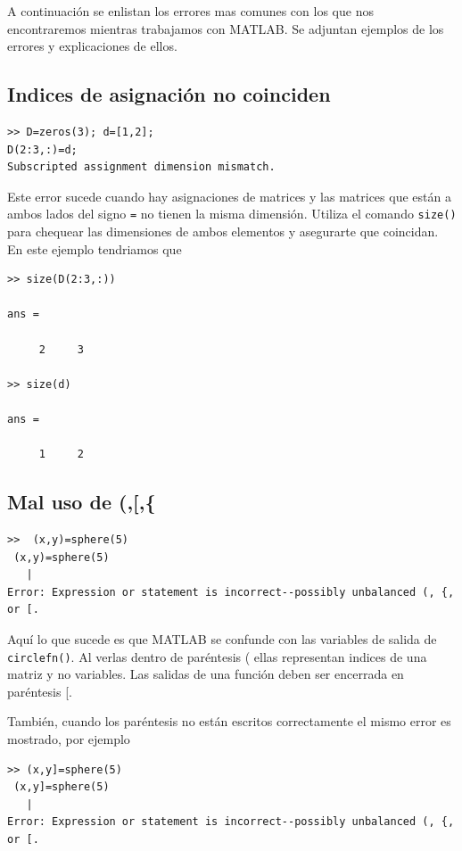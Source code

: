 \documentclass[11pt]{article}
\begin{document}
A continuaci\'on se enlistan los errores mas comunes con los que nos encontraremos mientras trabajamos con MATLAB. Se adjuntan ejemplos de los errores y explicaciones de ellos.

\subsection{Indices de asignaci\'on no coinciden}
\begin{verbatim}
>> D=zeros(3); d=[1,2];
D(2:3,:)=d;
Subscripted assignment dimension mismatch.
\end{verbatim}
Este error sucede cuando hay asignaciones de matrices  y las matrices que están a ambos lados del signo \texttt{=} no tienen la misma dimensi\'on. Utiliza el comando \texttt{size()} para 
chequear las dimensiones de ambos elementos y asegurarte que coincidan. En este 
ejemplo tendriamos que
\begin{verbatim}
>> size(D(2:3,:))

ans =

     2     3

>> size(d)

ans =

     1     2
\end{verbatim}

\subsection{Mal uso de (,[,\{}
\begin{verbatim}
>>  (x,y)=sphere(5)
 (x,y)=sphere(5)
   |
Error: Expression or statement is incorrect--possibly unbalanced (, {, or [.
\end{verbatim}
Aqu\'i lo que sucede es que MATLAB se confunde con las variables de salida de 
\texttt{circlefn()}. Al verlas dentro de par\'entesis ( ellas representan 
indices de una matriz y no variables. Las salidas de una funci\'on 
deben ser encerrada en par\'entesis [. 

Tambi\'en, cuando los par\'entesis no est\'an escritos correctamente 
el mismo error es mostrado, por ejemplo
\begin{verbatim} 
>> (x,y]=sphere(5)
 (x,y]=sphere(5)
   |
Error: Expression or statement is incorrect--possibly unbalanced (, {, or [.
\end{verbatim}
\end{document}
